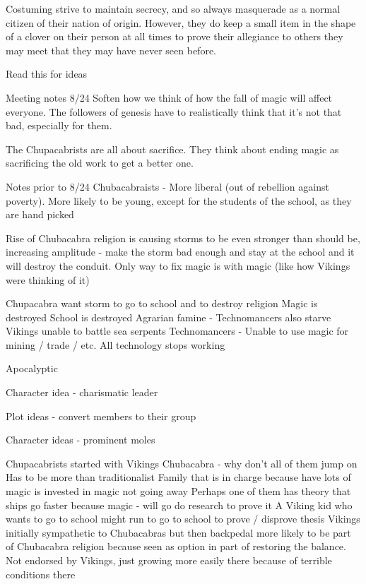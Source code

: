 \documentclass[blue]{GL2020}
\begin{document}
Costuming
\pCult strive to maintain secrecy, and so always masquerade as a normal citizen of their nation of origin. However, they do keep a small item in the shape of a clover on their person at all times to prove their allegiance to others they may meet that they may have never seen before.





Read this for ideas \/

Meeting notes 8/24
Soften how we think of how the fall of magic will affect everyone. The followers of genesis have to realistically think that it’s not that bad, especially for them.

The Chupacabrists are all about sacrifice. They think about ending magic as sacrificing the old work to get a better one.

Notes prior to 8/24
Chubacabraists - More liberal (out of rebellion against poverty). More likely to be young, except for the students of the school, as they are hand picked

Rise of Chubacabra religion is causing storms to be even stronger than should be, increasing amplitude - make the storm bad enough and stay at the school and it will destroy the conduit.  Only way to fix magic is with magic (like how Vikings were thinking of it)

Chupacabra want storm to go to school and to destroy religion
Magic is destroyed
School is destroyed
Agrarian famine - Technomancers also starve
Vikings unable to battle sea serpents
Technomancers - Unable to use magic for mining / trade / etc.  All technology stops working

Apocalyptic

Character idea - charismatic leader

Plot ideas - convert members to their group

Character ideas - prominent moles

Chupacabrists started with Vikings
Chubacabra - why don’t all of them jump on
Has to be more than traditionalist
Family that is in charge because have lots of magic is invested in magic not going away
Perhaps one of them has theory that ships go faster because magic - will go do research to prove it
A Viking kid who wants to go to school might run to go to school to prove / disprove thesis
Vikings initially sympathetic to Chubacabras but then backpedal
more likely to be part of Chubacabra religion because seen as option in part of restoring the balance.  Not endorsed by Vikings, just growing more easily there because of terrible conditions there
\end{document}
